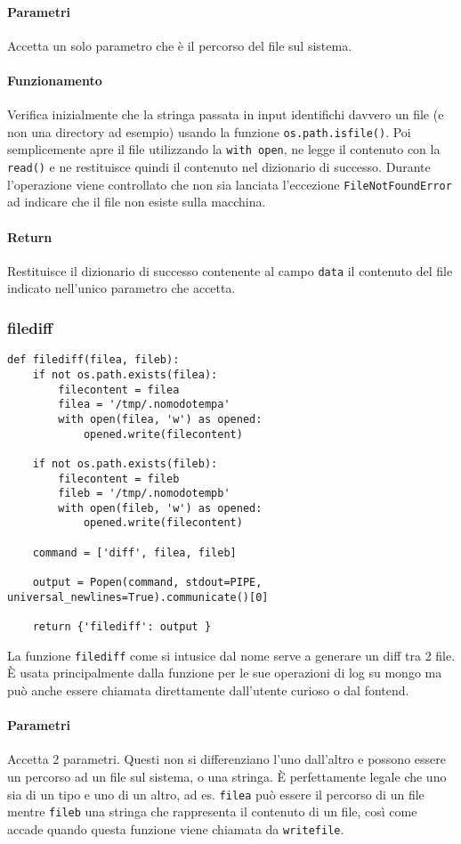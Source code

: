 \documentclass[11pt]{article}
\begin{document}
\paragraph{Parametri}
Accetta un solo parametro che è il percorso del file sul sistema.
\paragraph{Funzionamento}
Verifica inizialmente che la stringa passata in input identifichi davvero un file (e non una directory ad esempio) usando
la funzione \texttt{os.path.isfile()}.
Poi semplicemente apre il file utilizzando la \texttt{with open}, ne legge il contenuto con la \texttt{read()} e ne restituisce
quindi il contenuto nel dizionario di successo.
Durante l'operazione viene controllato che non sia lanciata l'eccezione \texttt{FileNotFoundError} ad indicare che il file
non esiste sulla macchina.
\paragraph{Return}
Restituisce il dizionario di successo contenente al campo \texttt{data} il contenuto del file indicato nell'unico
parametro che accetta.

\subsubsection{filediff}\label{filediff}
\begin{lstlisting}
def filediff(filea, fileb):
    if not os.path.exists(filea):
        filecontent = filea
        filea = '/tmp/.nomodotempa'
        with open(filea, 'w') as opened:
            opened.write(filecontent)

    if not os.path.exists(fileb):
        filecontent = fileb
        fileb = '/tmp/.nomodotempb'
        with open(fileb, 'w') as opened:
            opened.write(filecontent)

    command = ['diff', filea, fileb]

    output = Popen(command, stdout=PIPE, universal_newlines=True).communicate()[0]

    return {'filediff': output }
\end{lstlisting}
La funzione \texttt{filediff} come si intusice dal nome serve a generare un diff tra 2 file. È usata principalmente dalla funzione 
per le sue operazioni di log su mongo ma può anche essere chiamata direttamente dall'utente curioso o dal fontend.
\paragraph{Parametri}
Accetta 2 parametri. Questi non si differenziano l'uno dall'altro e possono essere un percorso ad un file sul sistema, o una stringa.
È perfettamente legale che uno sia di un tipo e uno di un altro, ad es. \texttt{filea} può essere il percorso di un file mentre \texttt{fileb}
una stringa che rappresenta il contenuto di un file, così come accade quando questa funzione viene chiamata da \texttt{writefile}.
\end{document}
